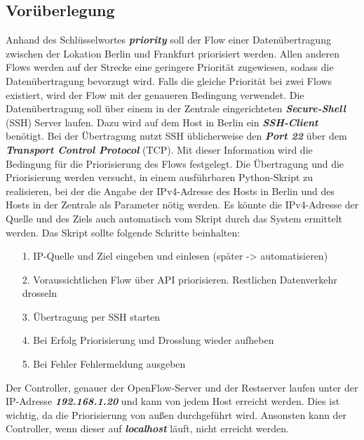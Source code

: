 \documentclass[fontsize=12pt,paper=a4,open=any,parskip=half,
  twoside=false,toc=listof,toc=bibliography,fleqn,leqno,
  captions=nooneline,captions=tableabove,british]{scrbook}
\begin{document}
\subsection{Vorüberlegung}
Anhand des Schlüsselwortes \textit{\textbf{priority}} soll der Flow einer Datenübertragung zwischen der Lokation Berlin und Frankfurt priorisiert werden. Allen anderen Flows werden auf der Strecke eine geringere Priorität zugewiesen, sodass die Datenübertragung bevorzugt wird. Falls die gleiche Priorität bei zwei Flows existiert, wird der Flow mit der genaueren Bedingung verwendet. Die Datenübertragung soll über einem in der Zentrale eingerichteten \textit{\textbf{Secure-Shell}} (SSH) Server laufen. Dazu wird auf dem Host in Berlin ein \textit{\textbf{SSH-Client}} benötigt. Bei der Übertragung nutzt SSH üblicherweise den \textit{\textbf{Port 22}} über dem \textit{\textbf{Transport Control Protocol}} (TCP). Mit dieser Information wird die Bedingung für die Priorisierung des Flows festgelegt. Die Übertragung und die Priorisierung werden versucht, in einem ausführbaren Python-Skript zu realisieren, bei der die Angabe der IPv4-Adresse des Hosts in Berlin und des Hosts in der Zentrale als Parameter nötig werden. Es könnte die IPv4-Adresse der Quelle und des Ziels auch automatisch vom Skript durch das System ermittelt werden. Das Skript sollte folgende Schritte beinhalten:
\begin{itemize}
\item[1.] IP-Quelle und Ziel eingeben und einlesen (später -> automatisieren)
\item[2.] Voraussichtlichen Flow über API priorisieren. Restlichen Datenverkehr drosseln
\item[3.] Übertragung per SSH starten
\item[4.] Bei Erfolg Priorisierung und Drosslung wieder aufheben
\item[5.] Bei Fehler Fehlermeldung ausgeben
\end{itemize}
Der Controller, genauer der OpenFlow-Server und der Restserver laufen unter der IP-Adresse \textit{\textbf{192.168.1.20}} und kann von jedem Host erreicht werden. Dies ist wichtig, da die Priorisierung von außen durchgeführt wird. Ansonsten kann der Controller, wenn dieser auf \textit{\textbf{localhost}} läuft, nicht erreicht werden.
\end{document}
